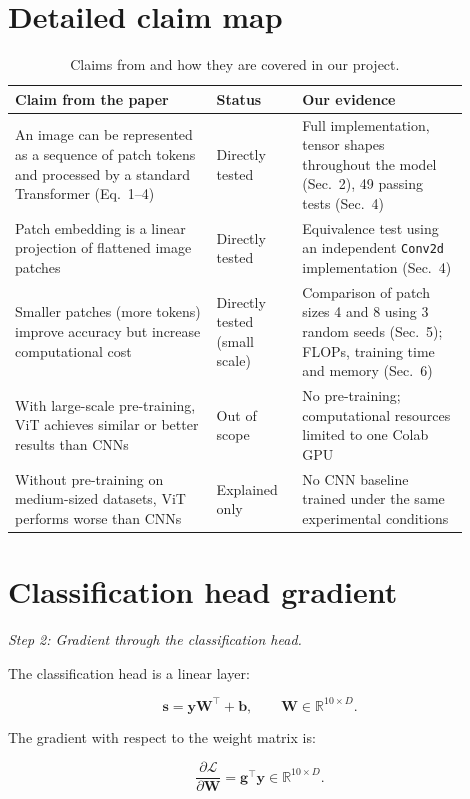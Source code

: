 \documentclass{article}
\begin{document}
\section{Detailed claim map}
\label{app:claimmap}
\begin{table}[h]
\centering
\small
\caption{Claims from \citet{dosovitskiy2021image} and how they are 
covered in our project.}
\label{tab:claims}
\begin{tabular}{p{0.40\linewidth}p{0.17\linewidth}p{0.33\linewidth}}
\toprule
Claim from the paper & Status & Our evidence \\
\midrule
An image can be represented as a sequence of patch tokens and 
processed by a standard Transformer (Eq.~1--4)
  & Directly tested
  & Full implementation, tensor shapes throughout the model 
    (Sec.~2), 49 passing tests (Sec.~4) \\
Patch embedding is a linear projection of flattened image patches
  & Directly tested
  & Equivalence test using an independent \texttt{Conv2d} 
    implementation (Sec.~4) \\
Smaller patches (more tokens) improve accuracy but increase 
computational cost
  & Directly tested (small scale)
  & Comparison of patch sizes 4 and 8 using 3 random seeds 
    (Sec.~5); FLOPs, training time and memory (Sec.~6) \\
With large-scale pre-training, ViT achieves similar or better 
results than CNNs
  & Out of scope
  & No pre-training; computational resources limited to one 
    Colab GPU \\
Without pre-training on medium-sized datasets, ViT performs 
worse than CNNs
  & Explained only
  & No CNN baseline trained under the same experimental conditions \\
\bottomrule
\end{tabular}
\end{table}
\section{Classification head gradient}\label{app:headgradient}
\emph{Step 2: Gradient through the classification head.}

The classification head is a linear layer:

\[
\mathbf{s} = \mathbf{y}\mathbf{W}^{\top} + \mathbf{b},
\qquad
\mathbf{W}\in\mathbb{R}^{10\times D}.
\]

The gradient with respect to the weight matrix is:

\[
\frac{\partial\mathcal{L}}{\partial\mathbf{W}}
= \mathbf{g}^{\top}\mathbf{y}
\in\mathbb{R}^{10\times D}.
\]
\end{document}

